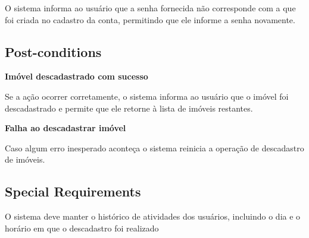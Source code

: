 O sistema informa ao usuário que a senha fornecida não corresponde com a que foi criada no cadastro da conta, permitindo que ele informe a senha novamente.

\subsection*{Post-conditions}

\textbf{Imóvel descadastrado com sucesso}

Se a ação ocorrer corretamente, o sistema informa ao usuário que o imóvel foi descadastrado e permite que ele retorne à lista de imóveis restantes.

\textbf{Falha ao descadastrar imóvel}

Caso algum erro inesperado aconteça o sistema reinicia a operação de descadastro de imóveis.

\subsection*{Special Requirements} 
O sistema deve manter o histórico de atividades dos usuários, incluindo o dia e o horário em que o descadastro foi realizado
